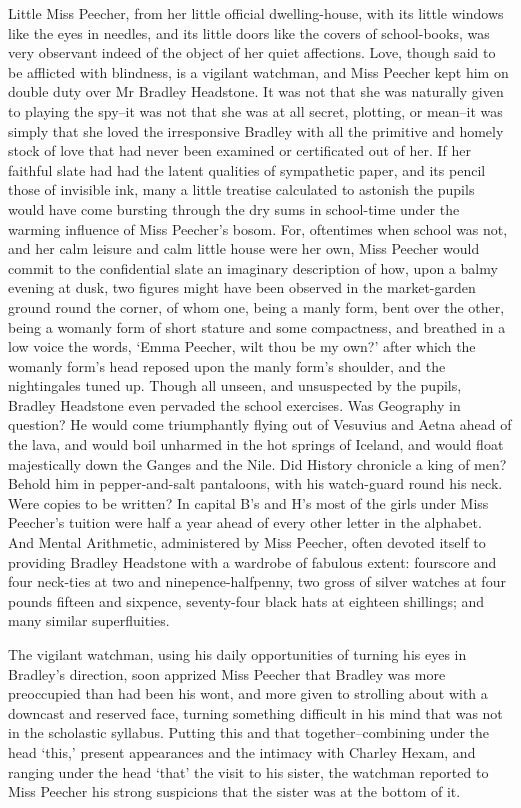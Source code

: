 Little Miss Peecher, from her little official dwelling-house, with its
little windows like the eyes in needles, and its little doors like the
covers of school-books, was very observant indeed of the object of her
quiet affections. Love, though said to be afflicted with blindness, is
a vigilant watchman, and Miss Peecher kept him on double duty over Mr
Bradley Headstone. It was not that she was naturally given to playing
the spy--it was not that she was at all secret, plotting, or mean--it
was simply that she loved the irresponsive Bradley with all the
primitive and homely stock of love that had never been examined or
certificated out of her. If her faithful slate had had the latent
qualities of sympathetic paper, and its pencil those of invisible ink,
many a little treatise calculated to astonish the pupils would have come
bursting through the dry sums in school-time under the warming influence
of Miss Peecher’s bosom. For, oftentimes when school was not, and her
calm leisure and calm little house were her own, Miss Peecher would
commit to the confidential slate an imaginary description of how, upon
a balmy evening at dusk, two figures might have been observed in the
market-garden ground round the corner, of whom one, being a manly form,
bent over the other, being a womanly form of short stature and some
compactness, and breathed in a low voice the words, ‘Emma Peecher, wilt
thou be my own?’ after which the womanly form’s head reposed upon the
manly form’s shoulder, and the nightingales tuned up. Though all unseen,
and unsuspected by the pupils, Bradley Headstone even pervaded the
school exercises. Was Geography in question? He would come triumphantly
flying out of Vesuvius and Aetna ahead of the lava, and would boil
unharmed in the hot springs of Iceland, and would float majestically
down the Ganges and the Nile. Did History chronicle a king of men?
Behold him in pepper-and-salt pantaloons, with his watch-guard round
his neck. Were copies to be written? In capital B’s and H’s most of the
girls under Miss Peecher’s tuition were half a year ahead of every other
letter in the alphabet. And Mental Arithmetic, administered by Miss
Peecher, often devoted itself to providing Bradley Headstone with a
wardrobe of fabulous extent: fourscore and four neck-ties at two and
ninepence-halfpenny, two gross of silver watches at four pounds fifteen
and sixpence, seventy-four black hats at eighteen shillings; and many
similar superfluities.

The vigilant watchman, using his daily opportunities of turning his eyes
in Bradley’s direction, soon apprized Miss Peecher that Bradley was more
preoccupied than had been his wont, and more given to strolling about
with a downcast and reserved face, turning something difficult in his
mind that was not in the scholastic syllabus. Putting this and that
together--combining under the head ‘this,’ present appearances and the
intimacy with Charley Hexam, and ranging under the head ‘that’ the
visit to his sister, the watchman reported to Miss Peecher his strong
suspicions that the sister was at the bottom of it.

